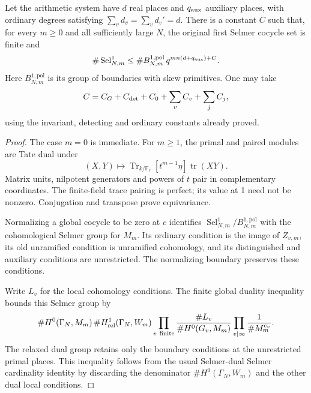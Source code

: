 \begin{proposition}
\label{prop:selmer-first-global-bound}
Let the arithmetic system have $d$ real places and $q_{\rm aux}$
auxiliary places, with ordinary degrees satisfying
$\sum_vd_v=\sum_vd_v'=d$. There is a constant $C$ such that, for
every $m\geq0$ and all sufficiently large $N$, the original first
Selmer cocycle set is finite and
\[
 \#\operatorname{Sel}^{1}_{N,m}
 \leq \#B^{1,\mathrm{pol}}_{N,m}\,
               q^{mn(d+q_{\rm aux})+C}.
\]
Here $B^{1,\mathrm{pol}}_{N,m}$ is its group of boundaries with skew
primitives. One may take
\[
          C=C_G+C_{\rm det}+C_0+\sum_vC_v+\sum_jC_j,
\]
using the invariant, detecting and ordinary constants already proved.
\end{proposition}
\begin{proof}
The case $m=0$ is immediate. For $m\geq1$, the primal and paired
modules are Tate dual under
\[
 (X,Y)\longmapsto\operatorname{Tr}_{k/\mathbb F_\ell}
                       [t^{m-1}\eta]\operatorname{tr}(XY).
\]
Matrix units, nilpotent generators and powers of $t$ pair in complementary
coordinates. The finite-field trace pairing is perfect; its value at
1 need not be nonzero. Conjugation and transpose prove equivariance.

Normalizing a global cocycle to be zero at $c$ identifies
$\operatorname{Sel}^{1}_{N,m}/B^{1,\mathrm{pol}}_{N,m}$ with the
cohomological Selmer group for $M_m$. Its ordinary condition is the
image of $Z_{v,m}$, its old unramified condition is unramified
cohomology, and its distinguished and auxiliary conditions are
unrestricted. The normalizing boundary preserves these conditions.

Write $L_v$ for the local cohomology conditions. The finite global
duality inequality bounds this Selmer group by
\[
 \#H^0(\Gamma_N,M_m)\,
 \#H^1_{\rm rel}(\Gamma_N,W_m)
 \prod_{v\ \mathrm{finite}}\frac{\#L_v}{\#H^0(G_v,M_m)}
 \prod_{v\mid\infty}\frac1{\#M_m^{c_v}}.
\]
The relaxed dual group retains only the boundary conditions at the
unrestricted primal places. This inequality follows from the usual
Selmer-dual Selmer cardinality identity by discarding the denominator
$\#H^0(\Gamma_N,W_m)$ and the other dual local conditions.


\end{proof}
